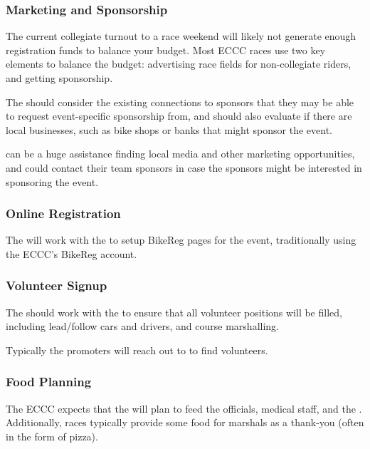 \subsubsection{Marketing and Sponsorship}

The current collegiate turnout to a race weekend will likely not generate enough registration funds to balance your budget.
Most ECCC races use two key elements to balance the budget: advertising race fields for non-collegiate riders, and getting sponsorship.

The  should consider the existing connections to sponsors that they may be able to request event-specific sponsorship from,
and should also evaluate if there are local businesses, such as bike shops or banks that might sponsor the event.

 can be a huge assistance finding local media and other marketing opportunities, and could contact their team sponsors
in case the sponsors might be interested in sponsoring the event.

\subsubsection{Online Registration}

The  will work with the  to setup BikeReg pages for the event,
traditionally using the ECCC's BikeReg account.

\subsubsection{Volunteer Signup}

The  should work with the  to ensure that all volunteer positions will be filled,
including lead/follow cars and drivers, and course marshalling.

Typically the promoters will reach out to  to find volunteers.

\subsubsection{Food Planning}

The ECCC expects that the  will plan to feed the officials, medical staff, and the .
Additionally, races typically provide some food for marshals as a thank-you (often in the form of pizza).
